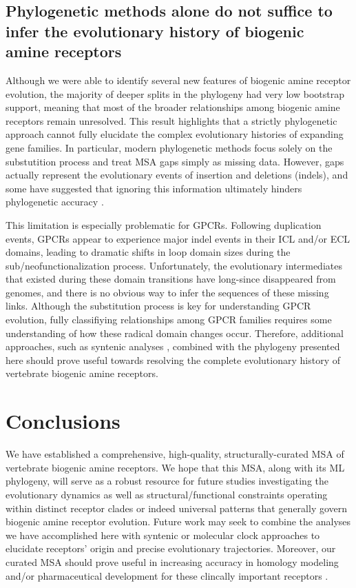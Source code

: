 \documentclass[fleqn,10pt]{wlpeerj}
\begin{document}
\subsection*{Phylogenetic methods alone do not suffice to infer the evolutionary history of biogenic amine receptors}
Although we were able to identify several new features of biogenic amine receptor evolution, the majority of deeper splits in the phylogeny had very low bootstrap support, meaning that most of the broader relationships among biogenic amine receptors remain unresolved. This result highlights that a strictly phylogenetic approach cannot fully elucidate the complex evolutionary histories of expanding gene families. In particular, modern phylogenetic methods focus solely on the substutition process and treat MSA gaps simply as missing data. However, gaps actually represent the evolutionary events of insertion and deletions (indels), and some have suggested that ignoring this information ultimately hinders phylogenetic accuracy \citep{Morrison2008,Loytynoja2008,Warnow2012,Luanetal2013}. 

This limitation is especially problematic for GPCRs. Following duplication events, GPCRs appear to experience major indel events in their ICL and/or ECL domains, leading to dramatic shifts in loop domain sizes during the sub/neofunctionalization process. Unfortunately, the evolutionary intermediates that existed during these domain transitions have long-since disappeared from genomes, and there is no obvious way to infer the sequences of these missing links. Although the substitution process is key for understanding GPCR evolution, fully classifiying relationships among GPCR families requires some understanding of how these radical domain changes occur. Therefore, additional approaches, such as syntenic analyses \citep{Sundstrom2010,Widmark2011,YegorovGood2012,Hwangetal2013}, combined with the phylogeny presented here should prove useful towards resolving the complete evolutionary history of vertebrate biogenic amine receptors. 


\section*{Conclusions}

We have established a comprehensive, high-quality, structurally-curated MSA of vertebrate biogenic amine receptors. We hope that this MSA, along with its ML phylogeny, will serve as a robust resource for future studies investigating the evolutionary dynamics as well as structural/functional constraints operating within distinct receptor clades or indeed universal patterns that generally govern biogenic amine receptor evolution. Future work may seek to combine the analyses we have accomplished here with syntenic or molecular clock approaches to elucidate receptors' origin and precise evolutionary trajectories. Moreover, our curated MSA should prove useful in increasing accuracy in homology modeling and/or pharmaceutical development for these clincally important receptors \citep{Kristiansen2004,Ishiguro2004,Eversetal2005,Masonetal2012}.
\end{document}
